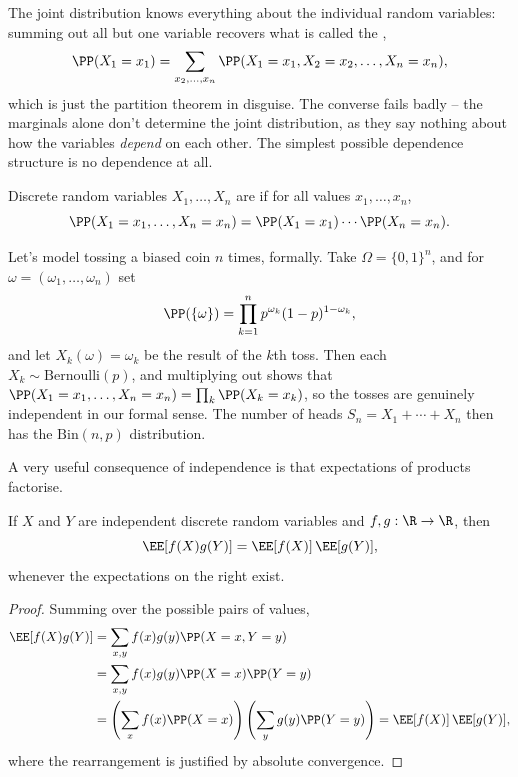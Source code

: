 The joint distribution knows everything about the individual random variables: summing out all but one variable recovers what is called the ,
$$
\PP(X_1 = x_1) = \sum_{x_2, \dots, x_n} \PP(X_1 = x_1, X_2 = x_2, \dots, X_n = x_n),
$$
which is just the partition theorem in disguise. The converse fails badly -- the marginals alone don't determine the joint distribution, as they say nothing about how the variables \emph{depend} on each other. The simplest possible dependence structure is no dependence at all.

\begin{definition}
	Discrete random variables $X_1, \dots, X_n$ are  if for all values $x_1, \dots, x_n$,
	$$
	\PP(X_1 = x_1, \dots, X_n = x_n) = \PP(X_1 = x_1) \cdots \PP(X_n = x_n).
	$$
\end{definition}

\begin{example}
	Let's model tossing a biased coin $n$ times, formally. Take $\Omega = \{0, 1\}^n$, and for $\omega = (\omega_1, \dots, \omega_n)$ set
	$$
	\PP(\{\omega\}) = \prod_{k=1}^n p^{\omega_k}(1 - p)^{1 - \omega_k},
	$$
	and let $X_k(\omega) = \omega_k$ be the result of the $k$th toss. Then each $X_k \sim \mathrm{Bernoulli}(p)$, and multiplying out shows that $\PP(X_1 = x_1, \dots, X_n = x_n) = \prod_k \PP(X_k = x_k)$, so the tosses are genuinely independent in our formal sense. The number of heads $S_n = X_1 + \cdots + X_n$ then has the $\mathrm{Bin}(n, p)$ distribution.
\end{example}

A very useful consequence of independence is that expectations of products factorise.

\begin{theorem}
	If $X$ and $Y$ are independent discrete random variables and $f, g: \R \rightarrow \R$, then
	$$
	\EE[f(X)g(Y)] = \EE[f(X)] \, \EE[g(Y)],
	$$
	whenever the expectations on the right exist.
\end{theorem}
\begin{proof}
	Summing over the possible pairs of values,
	\begin{align*}
		\EE[f(X)g(Y)] &= \sum_{x, y} f(x)g(y)\PP(X = x, Y = y) \\
		&= \sum_{x, y} f(x)g(y)\PP(X = x)\PP(Y = y) \\
		&= \left(\sum_x f(x)\PP(X = x)\right)\left(\sum_y g(y) \PP(Y = y)\right) = \EE[f(X)]\,\EE[g(Y)],
	\end{align*}
	where the rearrangement is justified by absolute convergence.
\end{proof}


